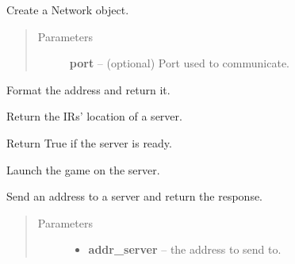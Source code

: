 \documentclass[letterpaper,10pt,english]{sphinxmanual}
\begin{document}
\begin{fulllineitems}
\label{api:network.Network}
Create a Network object.
\begin{quote}\begin{description}
\item[{Parameters}] \leavevmode
\textbf{port} -- (optional) Port used to communicate.

\end{description}\end{quote}

\begin{fulllineitems}
\label{api:network.Network.format}
Format the address and return it.

\end{fulllineitems}


\begin{fulllineitems}
\label{api:network.Network.get_irs}
Return the IRs' location of a server.

\end{fulllineitems}


\begin{fulllineitems}
\label{api:network.Network.is_ready}
Return True if the server is ready.

\end{fulllineitems}


\begin{fulllineitems}
\label{api:network.Network.launch}
Launch the game on the server.

\end{fulllineitems}


\begin{fulllineitems}
\label{api:network.Network.send_addr}
Send an address to a server and return the response.
\begin{quote}\begin{description}
\item[{Parameters}] \leavevmode\begin{itemize}
\item {} 
\textbf{addr\_server} -- the address to send to.


\end{itemize}
\end{description}
\end{quote}
\end{fulllineitems}
\end{fulllineitems}
\end{document}
